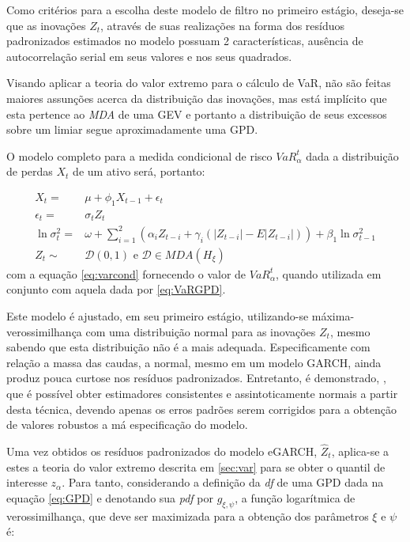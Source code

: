 \documentclass[1p]{elsarticle}
\theoremstyle{definition}
\begin{document}
Como critérios para a escolha deste modelo de filtro no primeiro estágio, deseja-se que as inovações $Z_t$, através de suas realizações na forma dos resíduos padronizados estimados no modelo possuam 2 características, ausência de autocorrelação serial em seus valores e nos seus quadrados.

Visando aplicar a teoria do valor extremo para o cálculo de VaR, não são feitas maiores assunções acerca da distribuição das inovações, mas está implícito que esta pertence ao \emph{MDA} de uma GEV e portanto a distribuição de seus excessos sobre um limiar segue aproximadamente uma GPD.

O modelo completo para a medida condicional de risco $VaR_\alpha^t$ dada a distribuição de perdas $X_t$ de um ativo será, portanto:

\begin{align}
X_t=&\mu+ \phi_1 X_{t-1}+\epsilon_t \\
\epsilon_t=&\sigma_t Z_t\\
\ln\sigma_t^2=&\omega+ \sum_{i=1}^{2}\left(\alpha_i Z_{t-i}+ \gamma_i(|Z_{t-i}|-E|Z_{t-i}|)\right)+ \beta_1 \ln\sigma_{t-1}^2 \label{eq:sigma2} \\
Z_t\sim &\mathcal{D}(0,1) \text{ e } \mathcal{D} \in MDA(H_\xi)
\end{align}
com a equação \eqref{eq:varcond} fornecendo o valor de $VaR_\alpha^t$, quando utilizada em conjunto com aquela dada por \eqref{eq:VaRGPD}.

Este modelo é ajustado, em seu primeiro estágio, utilizando-se máxima-verossimilhança com uma distribuição normal para as inovações $Z_t$, mesmo sabendo que esta distribuição não é a mais adequada. Especificamente com relação a massa das caudas, a normal, mesmo em um modelo GARCH, ainda produz pouca curtose nos resíduos padronizados. Entretanto, é demonstrado, \cite[Capítulo 4]{Gourieroux1997}, que é possível obter estimadores consistentes e assintoticamente normais a partir desta técnica, devendo apenas os erros padrões serem corrigidos para a obtenção de valores robustos a má especificação do modelo.

Uma vez obtidos os resíduos padronizados do modelo eGARCH, $\hat{Z}_t$, aplica-se a estes a teoria do valor extremo descrita em \ref{sec:var} para se obter o quantil de interesse $z_\alpha$. Para tanto, considerando a definição da \emph{df} de uma GPD dada na equação \eqref{eq:GPD} e denotando sua \emph{pdf} por $g_{\xi, \psi}$, a função logarítmica de verossimilhança, que deve ser maximizada para a obtenção dos parâmetros $\xi$ e $\psi$ é:
\end{document}
